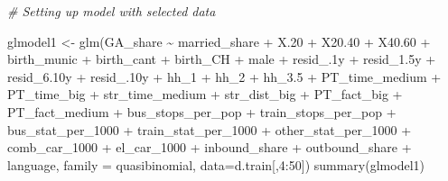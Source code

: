 \documentclass[
]{article}
\newenvironment{Shaded}{\begin{snugshade}}{\end{snugshade}}
\newcommand{\AttributeTok}[1]{\textcolor[rgb]{0.77,0.63,0.00}{#1}}
\newcommand{\CommentTok}[1]{\textcolor[rgb]{0.56,0.35,0.01}{\textit{#1}}}
\newcommand{\DecValTok}[1]{\textcolor[rgb]{0.00,0.00,0.81}{#1}}
\newcommand{\FloatTok}[1]{\textcolor[rgb]{0.00,0.00,0.81}{#1}}
\newcommand{\FunctionTok}[1]{\textcolor[rgb]{0.00,0.00,0.00}{#1}}
\newcommand{\NormalTok}[1]{#1}
\newcommand{\OtherTok}[1]{\textcolor[rgb]{0.56,0.35,0.01}{#1}}
\newcommand{\SpecialCharTok}[1]{\textcolor[rgb]{0.00,0.00,0.00}{#1}}
\begin{document}
\begin{Shaded}
\begin{Highlighting}[]
\CommentTok{\# Setting up model with selected data}

\NormalTok{glmodel1 }\OtherTok{\textless{}{-}} \FunctionTok{glm}\NormalTok{(GA\_share }\SpecialCharTok{\textasciitilde{}}\NormalTok{ married\_share }\SpecialCharTok{+}\NormalTok{ X}\FloatTok{.20} \SpecialCharTok{+}\NormalTok{ X20}\FloatTok{.40} \SpecialCharTok{+}\NormalTok{ X40}\FloatTok{.60} \SpecialCharTok{+} 
\NormalTok{    birth\_munic }\SpecialCharTok{+}\NormalTok{ birth\_cant }\SpecialCharTok{+}\NormalTok{ birth\_CH }\SpecialCharTok{+}\NormalTok{ male }\SpecialCharTok{+}\NormalTok{ resid\_}\FloatTok{.1}\NormalTok{y }\SpecialCharTok{+} 
\NormalTok{    resid\_1}\FloatTok{.5}\NormalTok{y }\SpecialCharTok{+}\NormalTok{ resid\_6}\FloatTok{.10}\NormalTok{y }\SpecialCharTok{+}\NormalTok{ resid\_}\FloatTok{.10}\NormalTok{y }\SpecialCharTok{+}\NormalTok{ hh\_1 }\SpecialCharTok{+}\NormalTok{ hh\_2 }\SpecialCharTok{+}\NormalTok{ hh\_3}\FloatTok{.5} \SpecialCharTok{+} 
\NormalTok{    PT\_time\_medium }\SpecialCharTok{+}\NormalTok{ PT\_time\_big }\SpecialCharTok{+}\NormalTok{ str\_time\_medium }\SpecialCharTok{+}\NormalTok{ str\_dist\_big }\SpecialCharTok{+} 
\NormalTok{    PT\_fact\_big }\SpecialCharTok{+}\NormalTok{ PT\_fact\_medium }\SpecialCharTok{+}\NormalTok{ bus\_stops\_per\_pop }\SpecialCharTok{+}\NormalTok{ train\_stops\_per\_pop }\SpecialCharTok{+} 
\NormalTok{    bus\_stat\_per\_1000 }\SpecialCharTok{+}\NormalTok{ train\_stat\_per\_1000 }\SpecialCharTok{+}\NormalTok{ other\_stat\_per\_1000 }\SpecialCharTok{+} 
\NormalTok{    comb\_car\_1000 }\SpecialCharTok{+}\NormalTok{ el\_car\_1000 }\SpecialCharTok{+}\NormalTok{ inbound\_share }\SpecialCharTok{+}\NormalTok{ outbound\_share }\SpecialCharTok{+} 
\NormalTok{    language, }\AttributeTok{family =}\NormalTok{ quasibinomial,}
    \AttributeTok{data=}\NormalTok{d.train[,}\DecValTok{4}\SpecialCharTok{:}\DecValTok{50}\NormalTok{])}
\FunctionTok{summary}\NormalTok{(glmodel1)}
\end{Highlighting}
\end{Shaded}
\end{document}
